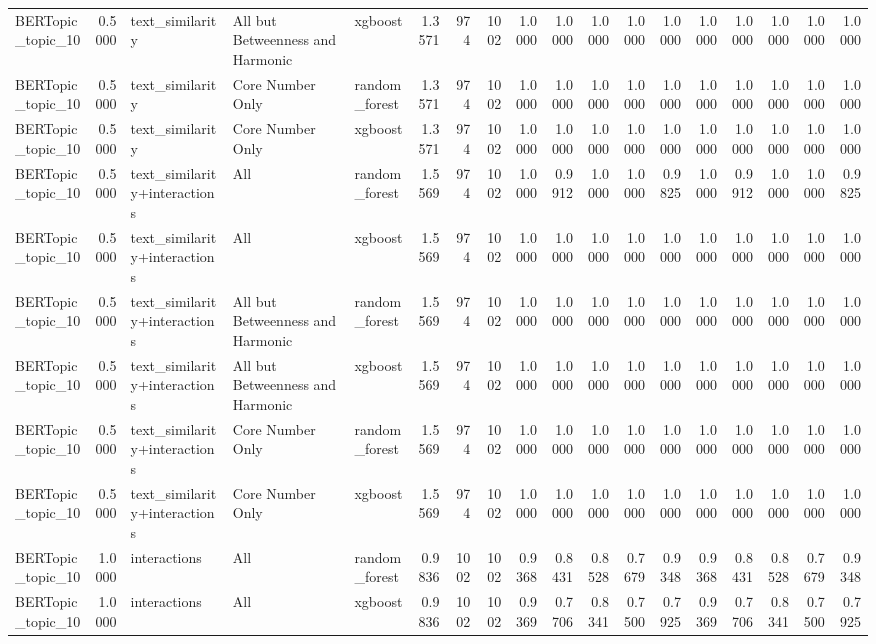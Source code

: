 \begin{tabular}{lrlllrrrrrrrrrrrrr}
BERTopic_topic_10 & 0.5000 & text_similarity & All but Betweenness and Harmonic & xgboost & 1.3571 & 974 & 1002 & 1.0000 & 1.0000 & 1.0000 & 1.0000 & 1.0000 & 1.0000 & 1.0000 & 1.0000 & 1.0000 & 1.0000 \\
BERTopic_topic_10 & 0.5000 & text_similarity & Core Number Only & random_forest & 1.3571 & 974 & 1002 & 1.0000 & 1.0000 & 1.0000 & 1.0000 & 1.0000 & 1.0000 & 1.0000 & 1.0000 & 1.0000 & 1.0000 \\
BERTopic_topic_10 & 0.5000 & text_similarity & Core Number Only & xgboost & 1.3571 & 974 & 1002 & 1.0000 & 1.0000 & 1.0000 & 1.0000 & 1.0000 & 1.0000 & 1.0000 & 1.0000 & 1.0000 & 1.0000 \\
BERTopic_topic_10 & 0.5000 & text_similarity+interactions & All & random_forest & 1.5569 & 974 & 1002 & 1.0000 & 0.9912 & 1.0000 & 1.0000 & 0.9825 & 1.0000 & 0.9912 & 1.0000 & 1.0000 & 0.9825 \\
BERTopic_topic_10 & 0.5000 & text_similarity+interactions & All & xgboost & 1.5569 & 974 & 1002 & 1.0000 & 1.0000 & 1.0000 & 1.0000 & 1.0000 & 1.0000 & 1.0000 & 1.0000 & 1.0000 & 1.0000 \\
BERTopic_topic_10 & 0.5000 & text_similarity+interactions & All but Betweenness and Harmonic & random_forest & 1.5569 & 974 & 1002 & 1.0000 & 1.0000 & 1.0000 & 1.0000 & 1.0000 & 1.0000 & 1.0000 & 1.0000 & 1.0000 & 1.0000 \\
BERTopic_topic_10 & 0.5000 & text_similarity+interactions & All but Betweenness and Harmonic & xgboost & 1.5569 & 974 & 1002 & 1.0000 & 1.0000 & 1.0000 & 1.0000 & 1.0000 & 1.0000 & 1.0000 & 1.0000 & 1.0000 & 1.0000 \\
BERTopic_topic_10 & 0.5000 & text_similarity+interactions & Core Number Only & random_forest & 1.5569 & 974 & 1002 & 1.0000 & 1.0000 & 1.0000 & 1.0000 & 1.0000 & 1.0000 & 1.0000 & 1.0000 & 1.0000 & 1.0000 \\
BERTopic_topic_10 & 0.5000 & text_similarity+interactions & Core Number Only & xgboost & 1.5569 & 974 & 1002 & 1.0000 & 1.0000 & 1.0000 & 1.0000 & 1.0000 & 1.0000 & 1.0000 & 1.0000 & 1.0000 & 1.0000 \\
BERTopic_topic_10 & 1.0000 & interactions & All & random_forest & 0.9836 & 1002 & 1002 & 0.9368 & 0.8431 & 0.8528 & 0.7679 & 0.9348 & 0.9368 & 0.8431 & 0.8528 & 0.7679 & 0.9348 \\
BERTopic_topic_10 & 1.0000 & interactions & All & xgboost & 0.9836 & 1002 & 1002 & 0.9369 & 0.7706 & 0.8341 & 0.7500 & 0.7925 & 0.9369 & 0.7706 & 0.8341 & 0.7500 & 0.7925 \\

\end{tabular}
